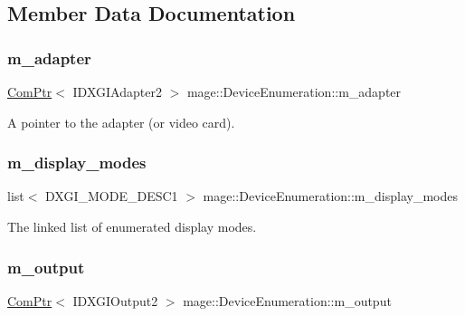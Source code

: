 \subsection{Member Data Documentation}
\hypertarget{classmage_1_1_device_enumeration_af53e43c5c1d67421831993a5fdc6014a}{}\label{classmage_1_1_device_enumeration_af53e43c5c1d67421831993a5fdc6014a} 
\subsubsection{\texorpdfstring{m\+\_\+adapter}{m\_adapter}}
{\footnotesize\ttfamily \hyperlink{namespacemage_ae74f374780900893caa5555d1031fd79}{Com\+Ptr}$<$ I\+D\+X\+G\+I\+Adapter2 $>$ mage\+::\+Device\+Enumeration\+::m\+\_\+adapter\hspace{0.3cm}{\ttfamily [private]}}

A pointer to the adapter (or video card). \hypertarget{classmage_1_1_device_enumeration_aae356ac476a35ce4074f61cfd75ecdbe}{}\label{classmage_1_1_device_enumeration_aae356ac476a35ce4074f61cfd75ecdbe} 
\subsubsection{\texorpdfstring{m\+\_\+display\+\_\+modes}{m\_display\_modes}}
{\footnotesize\ttfamily list$<$ D\+X\+G\+I\+\_\+\+M\+O\+D\+E\+\_\+\+D\+E\+S\+C1 $>$ mage\+::\+Device\+Enumeration\+::m\+\_\+display\+\_\+modes\hspace{0.3cm}{\ttfamily [private]}}

The linked list of enumerated display modes. \hypertarget{classmage_1_1_device_enumeration_a49580b67748053ed6172d6458b5083ca}{}\label{classmage_1_1_device_enumeration_a49580b67748053ed6172d6458b5083ca} 
\subsubsection{\texorpdfstring{m\+\_\+output}{m\_output}}
{\footnotesize\ttfamily \hyperlink{namespacemage_ae74f374780900893caa5555d1031fd79}{Com\+Ptr}$<$ I\+D\+X\+G\+I\+Output2 $>$ mage\+::\+Device\+Enumeration\+::m\+\_\+output\hspace{0.3cm}{\ttfamily [private]}}

